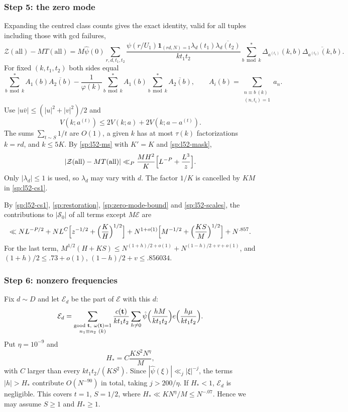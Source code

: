\subsubsection*{Step 5: the zero mode}
Expanding the centred class counts gives the exact identity, valid for all
tuples including those with gcd failures,
\begin{equation}\label{sp:zero-mode}
 \mathcal Z(\mathrm{all})-MT(\mathrm{all})
 =M\hat\psi(0)\sum_{r,d,t_1,t_2}
 \frac{\psi(r/U_1)\mathbf1_{(rd,N)=1}\lambda_d(t_1)\overline{\lambda_d(t_2)}}{kt_1t_2}
 \sum_{b\bmod k}^{*}\Delta_{a^{(t_1)}}(k,b)\overline{\Delta_{a^{(t_2)}}(k,b)} .
\end{equation}
For fixed $(k,t_1,t_2)$ both sides equal
\[
 \sum_{b\bmod k}^{*}A_1(b)\overline{A_2(b)}
 -\frac1{\varphi(k)}\sum_{b\bmod k}^{*}A_1(b)\sum_{b\bmod k}^{*}\overline{A_2(b)},
 \qquad A_i(b)=\sum_{\substack{n\equiv b\ (k)\\(n,t_i)=1}}a_n .
\]
Use
$|u\bar v|\le(|u|^2+|v|^2)/2$ and
\[
 V(k;a^{(t)})\le2V(k;a)+2V(k;a-a^{(t)}).
\]
The sums $\sum_{t\sim S}1/t$ are $O(1)$, a given $k$ has at most $\tau(k)$
factorizations $k=rd$, and $k\le5K$. By \eqref{sp:l52-ms} with $K'=K$ and
\eqref{sp:l52-mask},
\begin{equation}\label{sp:zero-mode-bound}
 |\mathcal Z(\mathrm{all})-MT(\mathrm{all})|\ll_P\frac{MH^2}K\Bigl[L^{-P}+\frac{L^3}z\Bigr].
\end{equation}
Only $|\lambda_d|\le1$ is used, so $\lambda_d$ may vary with $d$. The factor
$1/K$ is cancelled by $KM$ in \eqref{sp:l52-cs1}.

By \eqref{sp:l52-cs1}, \eqref{sp:restoration}, \eqref{sp:zero-mode-bound} and
\eqref{sp:l52-scales}, the contributions to $|\mathcal S_0|$ of all terms
except $M\mathcal E$ are
\begin{equation}\label{sp:nonspectral}
 \ll NL^{-P/2}+NL^{C}\Bigl[z^{-1/2}+\Bigl(\frac KH\Bigr)^{1/2}\Bigr]
 +N^{1+o(1)}\Bigl[M^{-1/2}+\Bigl(\frac{KS}M\Bigr)^{1/2}\Bigr]+N^{.857}.
\end{equation}
For the last term, $M^{1/2}(H+KS)\le N^{(1+h)/2+o(1)}+N^{(1-h)/2+v+o(1)}$,
and $(1+h)/2\le.73+o(1)$, $(1-h)/2+v\le.856034$.

\subsubsection*{Step 6: nonzero frequencies}
Fix $d\sim D$ and let $\mathcal E_d$ be the part of $\mathcal E$ with this
$d$:
\[
 \mathcal E_d=\sum_{\substack{\text{good }\mathbf t,\ \omega(\mathbf t)=1\\n_1\equiv n_2\ (k)}}\frac{c(\mathbf t)}{kt_1t_2}
 \sum_{h\ne0}\hat\psi\Bigl(\frac{hM}{kt_1t_2}\Bigr)e\Bigl(\frac{h\mu}{kt_1t_2}\Bigr).
\]
Put $\eta=10^{-9}$ and
\begin{equation}\label{sp:hstar}
 H_*=C\frac{KS^2N^\eta}M ,
\end{equation}
with $C$ larger than every $kt_1t_2/(KS^2)$. Since
$|\hat\psi(\xi)|\ll_j|\xi|^{-j}$, the terms $|h|>H_*$ contribute $O(N^{-90})$
in total, taking $j>200/\eta$. If $H_*<1$, $\mathcal E_d$ is negligible.
This covers $t=1$, $S=1/2$, where $H_*\ll KN^\eta/M\le N^{-.07}$. Hence we may
assume $S\ge1$ and $H_*\ge1$.

